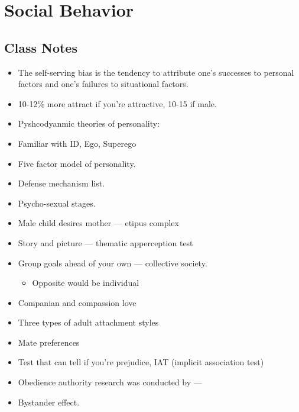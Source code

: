 \documentclass{article}
\begin{document}
\section{Social Behavior}

\subsection{Class Notes}
\begin{itemize}
    \item The self-serving bias is the tendency to attribute one’s successes to personal factors and one’s failures to situational factors.
    \item 10-12\% more attract if you're attractive, 10-15 if male.
    \item Pyshcodyanmic theories of personality:
    \item Familiar with ID, Ego, Superego
    \item Five factor model of personality.
    \item Defense mechanism list.
    \item Psycho-sexual stages.
    \item Male child desires mother --- etipus complex
    \item Story and picture --- thematic apperception test
    \item Group goals ahead of your own --- collective society.
    \begin{itemize}
        \item Opposite would be individual
    \end{itemize}
    \item Companian and compassion love
    \item Three types of adult attachment styles
    \item Mate preferences
    \item Test that can tell if you're prejudice, IAT (implicit association test)
    \item Obedience authority research was conducted by ---
    \item Bystander effect.
\end{itemize}
\end{document}
